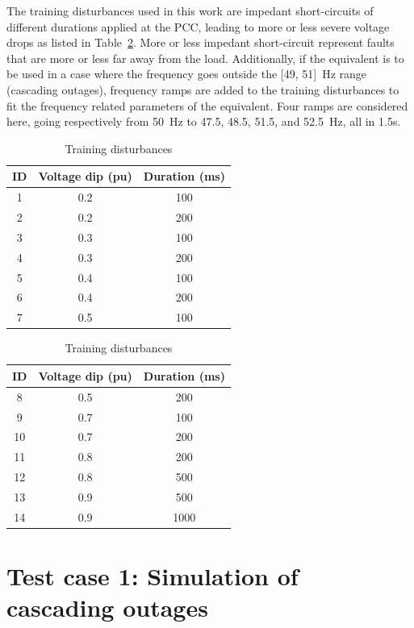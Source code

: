 The training disturbances used in this work are impedant short-circuits of different durations applied at the PCC, leading to more or less severe voltage drops as listed in Table~\ref{tab:disturbances}. More or less impedant short-circuit represent faults that are more or less far away from the load. Additionally, if the equivalent is to be used in a case where the frequency goes outside the [49, 51]~Hz range (cascading outages), frequency ramps are added to the training disturbances to fit the frequency related parameters of the equivalent. Four ramps are considered here, going respectively from 50~Hz to 47.5, 48.5, 51.5, and 52.5~Hz, all in 1.5s.

\begin{table}
\centering
\caption{Training disturbances}
\label{tab:disturbances}
\begin{tabular}{@{}ccc@{}}
\toprule
ID & Voltage dip (pu) & Duration (ms) \\ \midrule
1  & 0.2               & 100           \\
2  & 0.2               & 200           \\
3  & 0.3               & 100           \\
4  & 0.3               & 200           \\
5  & 0.4               & 100           \\
6  & 0.4               & 200           \\
7  & 0.5               & 100           \\ \bottomrule
\end{tabular}
\hspace{1cm}
\begin{tabular}{@{}ccc@{}}
\toprule
ID & Voltage dip (pu) & Duration (ms) \\ \midrule
8  & 0.5               & 200           \\
9  & 0.7               & 100           \\
10 & 0.7               & 200           \\
11 & 0.8               & 200           \\
12 & 0.8               & 500           \\
13 & 0.9               & 500           \\
14 & 0.9               & 1000          \\ \bottomrule
\end{tabular}
\end{table}


\section{Test case 1: Simulation of cascading outages}
\label{sec:distrib_ISGT}

